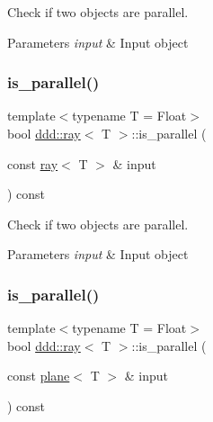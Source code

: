 Check if two objects are parallel. 


\begin{DoxyParams}{Parameters}
{\em input} & Input object \\
\hline
\end{DoxyParams}
\mbox{\label{classddd_1_1ray_ac17fe4f977e57135cff60d1b152fafb9}} 
\subsubsection{\texorpdfstring{is\+\_\+parallel()}{is\_parallel()}\hspace{0.1cm}{\footnotesize\ttfamily [3/5]}}
{\footnotesize\ttfamily template$<$typename T = Float$>$ \\
bool \hyperlink{classddd_1_1ray}{ddd\+::ray}$<$ T $>$\+::is\+\_\+parallel (\begin{DoxyParamCaption}\item[{const \hyperlink{classddd_1_1ray}{ray}$<$ T $>$ \&}]{input }\end{DoxyParamCaption}) const\hspace{0.3cm}{\ttfamily [inline]}}



Check if two objects are parallel. 


\begin{DoxyParams}{Parameters}
{\em input} & Input object \\
\hline
\end{DoxyParams}
\mbox{\label{classddd_1_1ray_abdbac6d010838f2cd59f877e6ed1fd48}} 
\subsubsection{\texorpdfstring{is\+\_\+parallel()}{is\_parallel()}\hspace{0.1cm}{\footnotesize\ttfamily [4/5]}}
{\footnotesize\ttfamily template$<$typename T = Float$>$ \\
bool \hyperlink{classddd_1_1ray}{ddd\+::ray}$<$ T $>$\+::is\+\_\+parallel (\begin{DoxyParamCaption}\item[{const \hyperlink{classddd_1_1plane}{plane}$<$ T $>$ \&}]{input }\end{DoxyParamCaption}) const\hspace{0.3cm}{\ttfamily [inline]}}



